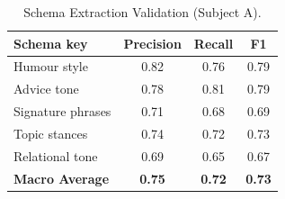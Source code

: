 \begin{table}[htbp]
\caption{Schema Extraction Validation (Subject A).}
\label{tab:schema_extraction}
\centering
\begin{tabular}{lccc}
\toprule
\textbf{Schema key} & \textbf{Precision} & \textbf{Recall} & \textbf{F1} \\
\midrule
Humour style        & 0.82 & 0.76 & 0.79 \\
Advice tone         & 0.78 & 0.81 & 0.79 \\
Signature phrases   & 0.71 & 0.68 & 0.69 \\
Topic stances       & 0.74 & 0.72 & 0.73 \\
Relational tone     & 0.69 & 0.65 & 0.67 \\
\midrule
\textbf{Macro Average} & \textbf{0.75} & \textbf{0.72} & \textbf{0.73} \\
\bottomrule
\end{tabular}
\end{table}
